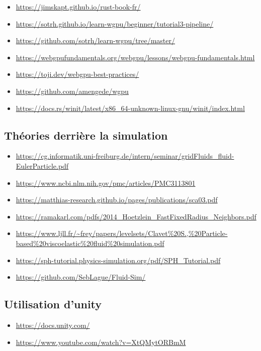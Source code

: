 \documentclass{article}
\begin{document}
\begin{itemize}
\item \url{https://jimskapt.github.io/rust-book-fr/}
\item \url{https://sotrh.github.io/learn-wgpu/beginner/tutorial3-pipeline/}
\item \url{https://github.com/sotrh/learn-wgpu/tree/master/}
\item \url{https://webgpufundamentals.org/webgpu/lessons/webgpu-fundamentals.html}
\item \url{https://toji.dev/webgpu-best-practices/}
\item \url{https://github.com/amengede/wgpu}
\item \url{https://docs.rs/winit/latest/x86_64-unknown-linux-gnu/winit/index.html}
\end{itemize}

\subsection{Théories derrière la simulation}

\begin{itemize}
\item \url{https://cg.informatik.uni-freiburg.de/intern/seminar/gridFluids_fluid-EulerParticle.pdf}
\item \url{https://www.ncbi.nlm.nih.gov/pmc/articles/PMC3113801}
\item \url{https://matthias-research.github.io/pages/publications/sca03.pdf}
\item \url{https://ramakarl.com/pdfs/2014_Hoetzlein_FastFixedRadius_Neighbors.pdf}
\item \url{https://www.ljll.fr/~frey/papers/levelsets/Clavet%20S.,%20Particle-based%20viscoelastic%20fluid%20simulation.pdf}
\item \url{https://sph-tutorial.physics-simulation.org/pdf/SPH_Tutorial.pdf}
\item \url{https://github.com/SebLague/Fluid-Sim/}
\end{itemize}

\subsection{Utilisation d'unity}

\begin{itemize}
\item \url{https://docs.unity.com/}
\item \url{https://www.youtube.com/watch?v=XtQMytORBmM}
\end{itemize}
\end{document}
